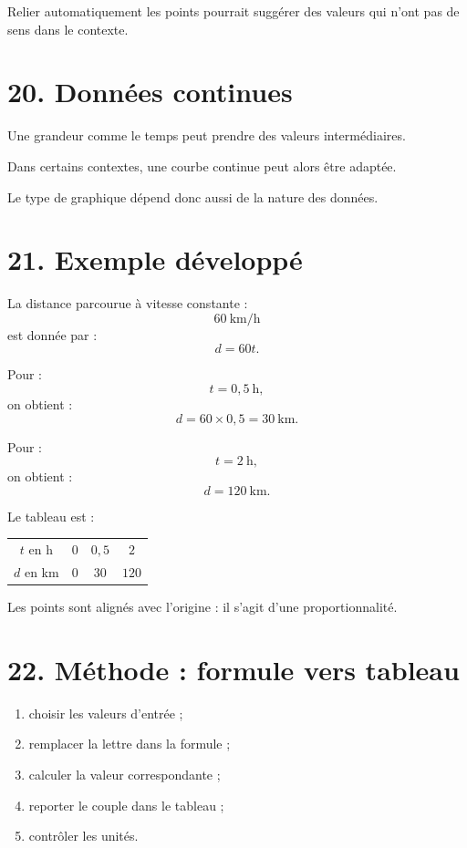 Relier automatiquement les points pourrait suggérer des valeurs qui n'ont pas de sens dans le contexte.

\section{20. Données continues}

Une grandeur comme le temps peut prendre des valeurs intermédiaires.

Dans certains contextes, une courbe continue peut alors être adaptée.

Le type de graphique dépend donc aussi de la nature des données.

\section{21. Exemple développé}

La distance parcourue à vitesse constante :
\[
60\ \text{km/h}
\]
est donnée par :
\[
d=60t.
\]

Pour :
\[
t=0{,}5\ \text{h},
\]
on obtient :
\[
d=60\times0{,}5=30\ \text{km}.
\]

Pour :
\[
t=2\ \text{h},
\]
on obtient :
\[
d=120\ \text{km}.
\]

Le tableau est :

\begin{tabular}{c|c|c|c}
$t$ en h & $0$ & $0{,}5$ & $2$ \\
$d$ en km & $0$ & $30$ & $120$ \\
\end{tabular}

Les points sont alignés avec l'origine : il s'agit d'une proportionnalité.

\section{22. Méthode : formule vers tableau}

\begin{methode}
\begin{enumerate}
\item choisir les valeurs d'entrée ;
\item remplacer la lettre dans la formule ;
\item calculer la valeur correspondante ;
\item reporter le couple dans le tableau ;
\item contrôler les unités.
\end{enumerate}
\end{methode}

